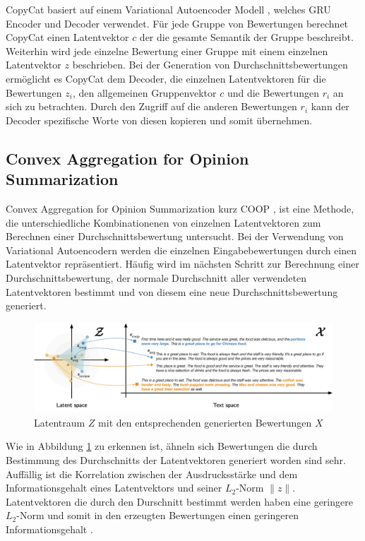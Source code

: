CopyCat basiert auf einem Variational Autoencoder Modell \citep{copycat}, welches GRU Encoder und Decoder verwendet. 
Für jede Gruppe von Bewertungen berechnet CopyCat einen Latentvektor $c$ der die gesamte Semantik der Gruppe beschreibt. 
Weiterhin wird jede einzelne Bewertung einer Gruppe mit einem einzelnen Latentvektor $z$ beschrieben.
Bei der Generation von Durchschnittsbewertungen ermöglicht es CopyCat dem Decoder, die einzelnen Latentvektoren für die Bewertungen $z_i$, den allgemeinen Gruppenvektor $c$ und die Bewertungen $r_i$ an sich zu betrachten.
Durch den Zugriff auf die anderen Bewertungen $r_i$ kann der Decoder spezifische Worte von diesen \glqq kopieren\grqq{}  und somit übernehmen.



\subsection{Convex Aggregation for Opinion Summarization}
\label{coop}
Convex Aggregation for Opinion Summarization kurz COOP \citep{coop}, ist eine Methode, die unterschiedliche Kombinationenen von einzelnen Latentvektoren zum Berechnen einer Durchschnittsbewertung untersucht.
Bei der Verwendung von Variational Autoencodern werden die einzelnen Eingabebewertungen durch einen Latentvektor repräsentiert. 
Häufig wird im nächsten Schritt zur Berechnung einer Durchschnittsbewertung, der normale Durchschnitt aller verwendeten Latentvektoren bestimmt und von diesem eine neue Durchschnittsbewertung generiert.

\begin{figure}[h]
    \centering
    \includegraphics[width=\textwidth]{bilder/coop}
    \caption{Latentraum $Z$ mit den entsprechenden generierten Bewertungen $X$ \citep{coop}}
    \label{coop_fig}
\end{figure}

Wie in Abbildung \ref{coop_fig} zu erkennen ist, ähneln sich Bewertungen die durch Bestimmung des Durchschnitts der Latentvektoren generiert worden sind sehr. 
Auffällig ist die Korrelation zwischen der Ausdrucksstärke und dem Informationsgehalt eines Latentvektors und seiner $L_2$-Norm $\| z \|$.
Latentvektoren die durch den Durschnitt bestimmt werden haben eine geringere $L_2$-Norm und somit in den erzeugten Bewertungen einen geringeren Informationsgehalt \citep{coop}.

